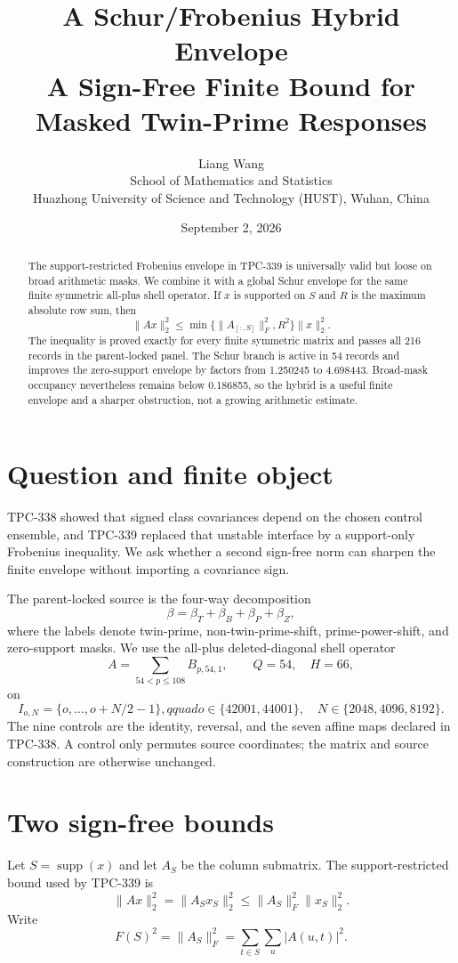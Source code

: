 \documentclass[10pt]{article}
\title{A Schur/Frobenius Hybrid Envelope\\
\large A Sign-Free Finite Bound for Masked Twin-Prime Responses}
\author{Liang Wang\\School of Mathematics and Statistics\\
Huazhong University of Science and Technology (HUST), Wuhan, China}
\date{September 2, 2026}
\begin{document}
\maketitle

\begin{abstract}
The support-restricted Frobenius envelope in TPC-339 is universally valid but
loose on broad arithmetic masks.  We combine it with a global Schur envelope
for the same finite symmetric all-plus shell operator.  If $x$ is supported on
$S$ and $R$ is the maximum absolute row sum, then
\[
 \|Ax\|_2^2\leq\min\{\|A_{[:,S]}\|_F^2,R^2\}\|x\|_2^2.
\]
The inequality is proved exactly for every finite symmetric matrix and passes
all 216 records in the parent-locked panel.  The Schur branch is active in 54
records and improves the zero-support envelope by factors from 1.250245 to
4.698443.  Broad-mask occupancy nevertheless remains below 0.186855, so the
hybrid is a useful finite envelope and a sharper obstruction, not a growing
arithmetic estimate.
\end{abstract}

\section{Question and finite object}

TPC-338 showed that signed class covariances depend on the chosen control
ensemble, and TPC-339 replaced that unstable interface by a support-only
Frobenius inequality.  We ask whether a second sign-free norm can sharpen the
finite envelope without importing a covariance sign.

The parent-locked source is the four-way decomposition
\[
 \beta=\beta_T+\beta_B+\beta_P+\beta_Z,
\]
where the labels denote twin-prime, non-twin-prime-shift, prime-power-shift,
and zero-support masks.  We use the all-plus deleted-diagonal shell operator
\[
 A=\sum_{54<p\leq108}B_{p,54,1},\qquad Q=54,\quad H=66,
\]
on
\[
 I_{o,N}=\{o,\ldots,o+N/2-1\},qquad
 o\in\{42001,44001\},\quad N\in\{2048,4096,8192\}.
\]
The nine controls are the identity, reversal, and the seven affine maps
declared in TPC-338.  A control only permutes source coordinates; the matrix
and source construction are otherwise unchanged.

\section{Two sign-free bounds}

Let $S=\operatorname{supp}(x)$ and let $A_S$ be the column submatrix.  The
support-restricted bound used by TPC-339 is
\begin{equation}
 \|Ax\|_2^2=\|A_Sx_S\|_2^2
 \leq \|A_S\|_F^2\|x_S\|_2^2.
 \label{eq:frob}
\end{equation}
Write
\[
 F(S)^2=\|A_S\|_F^2
 =\sum_{t\in S}\sum_u |A(u,t)|^2.
\]
\end{document}
